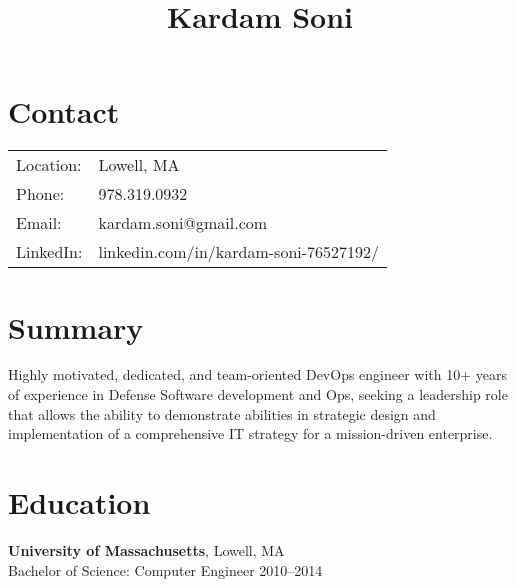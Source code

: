 \documentclass[letterpaper, 10pt]{article}
\begin{document}
\title{\vspace{-2cm}Kardam Soni}
\date{}
\maketitle

\section*{Contact}
\begin{tabular}{l l}
Location: & Lowell, MA \\
Phone: & 978.319.0932 \\
Email: & kardam.soni@gmail.com \\
LinkedIn: & linkedin.com/in/kardam-soni-76527192/
\end{tabular}

\section*{Summary}
Highly motivated, dedicated, and team-oriented DevOps engineer with 10+ years of experience in Defense Software development and Ops, seeking a leadership role that allows the ability to demonstrate abilities in strategic design and implementation of a comprehensive IT strategy for a mission-driven enterprise.

\section*{Education}
\textbf{University of Massachusetts}, Lowell, MA \\
Bachelor of Science: Computer Engineer \hfill 2010–2014
\end{document}

